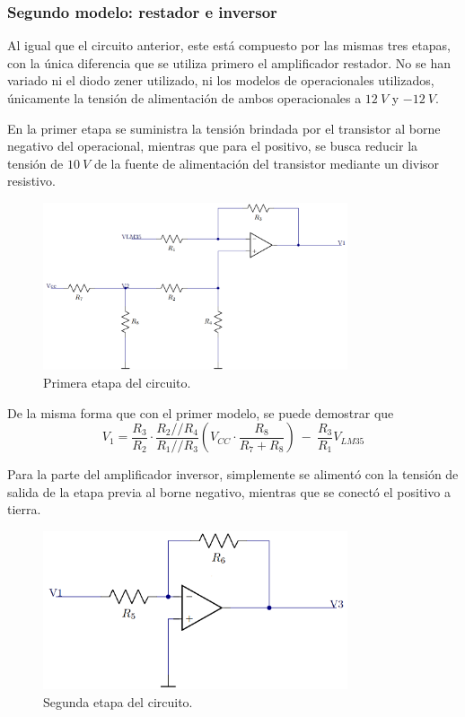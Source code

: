 \documentclass[a4paper]{article}
\begin{document}
\subsubsection{Segundo modelo: restador e inversor}

Al igual que el circuito anterior, este está compuesto por las mismas tres etapas, con la única diferencia que se utiliza primero el amplificador restador. No se han variado ni el diodo zener utilizado, ni los modelos de operacionales utilizados, únicamente la tensión de alimentación de ambos operacionales a $12 \ V$ y $-12 \ V$.

En la primer etapa se suministra la tensión brindada por el transistor al borne negativo del operacional, mientras que para el positivo, se busca reducir la tensión de $10 \ V$ de la fuente de alimentación del transistor mediante un divisor resistivo. 

\begin{figure}[H]
	\centering
	\includegraphics[width=0.8\textwidth]{Ejercicio6/Imagenes/CircuitoEtapa1-M2.png}
\caption{Primera etapa del circuito.}
	\label{fig:cir1-M2}
\end{figure}

De la misma forma que con el primer modelo, se puede demostrar que
\[
	V_1 = \frac{R_3}{R_2} \cdot \frac{R_2 // R_4}{R_1 // R_3} \left( V_{CC} \cdot \frac{R_8}{R_7 + R_8} \right) \ - \ \frac{R_3}{R_1} V_{LM35}
\]

Para la parte del amplificador inversor, simplemente se alimentó con la tensión de salida de la etapa previa al borne negativo, mientras que se conectó el positivo a tierra.

\begin{figure}[H]
	\centering
	\includegraphics[width=0.8\textwidth]{Ejercicio6/Imagenes/CircuitoEtapa2-M2.png}
	\caption{Segunda etapa del circuito.}
	\label{fig:cir2-M2}
\end{figure}
\end{document}
